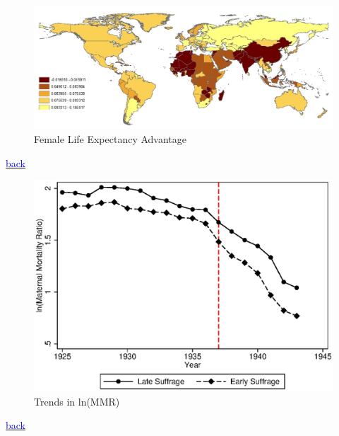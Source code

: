 \documentclass[legno]{beamer}
\begin{document}
\begin{frame}[plain,label=LEMap]
\begin{figure}[h!]
\centering
\includegraphics[scale= 0.45]{./figures/LE_ratio}
\caption{Female Life Expectancy Advantage}
\end{figure}
{\footnotesize \hyperlink{desc}{\textcolor{blue}{back}}}
\end{frame}

\begin{frame}[plain,label=Mtrend]
\begin{figure}[h!]
\centering
\caption{Trends in ln(MMR)}
\includegraphics[scale=0.67]{./figures/MMRtrends.eps}
\end{figure}
{\footnotesize \hyperlink{USA}{\textcolor{blue}{back}}}
\end{frame}
\end{document}
